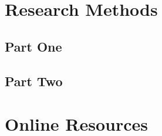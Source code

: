 \documentclass[12pt]{article}
\begin{document}
\newpage

 


\appendix

\section{Research Methods}

\subsection{Part One}



\subsection{Part Two}


\section{Online Resources}
\end{document}
